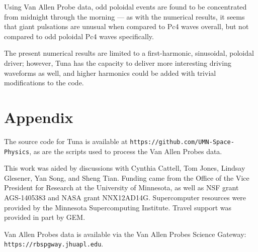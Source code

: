 \documentclass[draft,linenumbers]{agujournal}
\begin{document}
Using Van Allen Probe data, odd poloidal events are found to be concentrated from midnight through the morning --- as with the numerical results, it seems that giant pulsations are unusual when compared to Pc4 waves overall, but not compared to odd poloidal Pc4 waves specifically.


The present numerical results are limited to a first-harmonic, sinusoidal, poloidal driver; however, Tuna has the capacity to deliver more interesting driving waveforms as well, and higher harmonics could be added with trivial modifications to the code.







\appendix

\section{Appendix}

The source code for Tuna is available at \texttt{https://github.com/UMN-Space-Physics}, as are the scripts used to process the Van Allen Probes data.


\acknowledgments

This work was aided by discussions with Cynthia Cattell, Tom Jones, Lindsay Glesener, Yan Song, and Sheng Tian. Funding came from the Office of the Vice President for Research at the University of Minnesota, as well as NSF grant AGS-1405383 and NASA grant NNX12AD14G. Supercomputer resources were provided by the Minnesota Supercomputing Institute. Travel support was provided in part by GEM.

Van Allen Probes data is available via the Van Allen Probes Science Gateway: \texttt{https://rbspgway.jhuapl.edu}.
\end{document}
